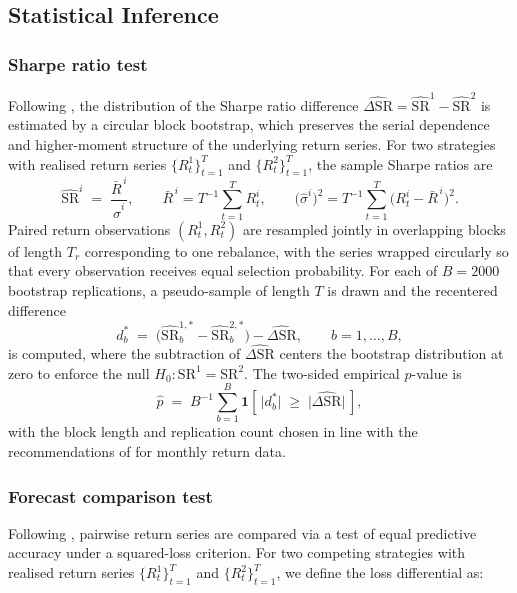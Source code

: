 \documentclass[12pt]{article}
\begin{document}
\subsection{Statistical Inference}
\label{inf_stats}

\subsubsection{Sharpe ratio test}
Following \cite{ledoitwolf2008}, the distribution of the Sharpe ratio difference $\widehat{\Delta\mathrm{SR}} = \widehat{\mathrm{SR}}^{1} - \widehat{\mathrm{SR}}^{2}$ is estimated by a circular block bootstrap, which preserves the serial dependence and higher-moment structure of the underlying return series. For two strategies with realised return series $\{R_t^{1}\}_{t=1}^{T}$ and $\{R_t^{2}\}_{t=1}^{T}$, the sample Sharpe ratios are
\[
\widehat{\mathrm{SR}}^{i} \;=\; \frac{\bar{R}^{\,i}}{\hat{\sigma}^{i}}, 
\qquad 
\bar{R}^{\,i} = T^{-1}\sum_{t=1}^{T} R_t^{i}, 
\qquad 
\big(\hat{\sigma}^{i}\big)^{2} = T^{-1}\sum_{t=1}^{T}\big(R_t^{i} - \bar{R}^{\,i}\big)^{2}.
\]
Paired return observations $(R_t^{1}, R_t^{2})$ are resampled jointly in overlapping blocks of length $T_r$ corresponding to one rebalance, with the series wrapped circularly so that every observation receives equal selection probability. For each of $B = 2000$ bootstrap replications, a pseudo-sample of length $T$ is drawn and the recentered difference
\[
d_b^{*} \;=\; \big(\widehat{\mathrm{SR}}^{1,*}_{b} - \widehat{\mathrm{SR}}^{2,*}_{b}\big) - \widehat{\Delta\mathrm{SR}}, 
\qquad b = 1,\dots,B,
\]
is computed, where the subtraction of $\widehat{\Delta\mathrm{SR}}$ centers the bootstrap distribution at zero to enforce the null $H_0:\mathrm{SR}^{1} = \mathrm{SR}^{2}$. The two-sided empirical $p$-value is
\[
\hat{p} \;=\; B^{-1}\sum_{b=1}^{B}\mathbf{1}\!\left[\,\big|d_b^{*}\big| \;\geq\; \big|\widehat{\Delta\mathrm{SR}}\big|\,\right],
\]
with the block length and replication count chosen in line with the recommendations of \cite{ledoitwolf2008} for monthly return data.

\subsubsection{Forecast comparison test}
Following \cite{dieboldmariano1995}, pairwise return series are compared via a test of equal predictive accuracy under a squared-loss criterion. For two competing strategies with realised return series $\{R_t^{1}\}_{t=1}^{T}$ and $\{R_t^{2}\}_{t=1}^{T}$, we define the loss differential as:
\end{document}
